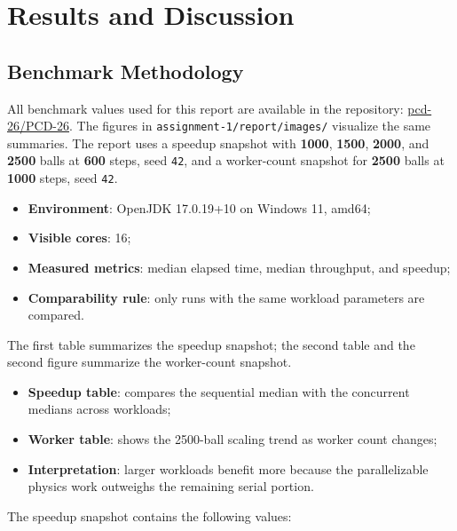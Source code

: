 \clearpage
\section{Results and Discussion}

\subsection{Benchmark Methodology}

All benchmark values used for this report are available in the repository:
\href{https://github.com/pcd-26/PCD-26}{pcd-26/PCD-26}. The figures in
\texttt{assignment-1/report/images/} visualize the same summaries. The report uses a speedup snapshot with
\textbf{1000}, \textbf{1500}, \textbf{2000}, and \textbf{2500} balls at \textbf{600} steps, seed \texttt{42}, and a
worker-count snapshot for \textbf{2500} balls at \textbf{1000} steps, seed \texttt{42}.

\begin{itemize}
    \item \textbf{Environment}: OpenJDK 17.0.19+10 on Windows 11, amd64;
    \item \textbf{Visible cores}: 16;
    \item \textbf{Measured metrics}: median elapsed time, median throughput, and speedup;
    \item \textbf{Comparability rule}: only runs with the same workload parameters are compared.
\end{itemize}

The first table summarizes the speedup snapshot; the second table and the second figure summarize the worker-count
snapshot.

\begin{itemize}
    \item \textbf{Speedup table}: compares the sequential median with the concurrent medians across workloads;
    \item \textbf{Worker table}: shows the 2500-ball scaling trend as worker count changes;
    \item \textbf{Interpretation}: larger workloads benefit more because the parallelizable physics work outweighs the remaining serial portion.
\end{itemize}

The speedup snapshot contains the following values:

